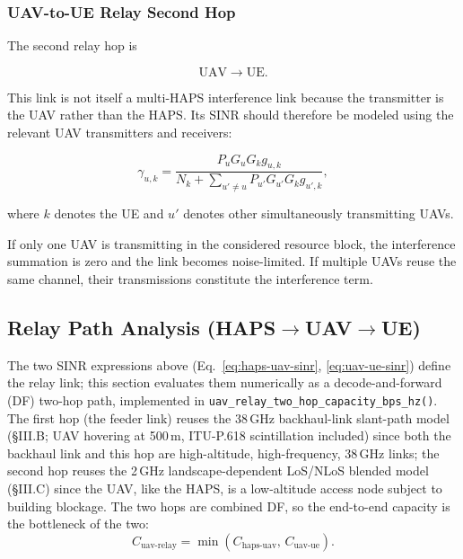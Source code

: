 \documentclass[conference]{IEEEtran}
\begin{document}
\subsubsection{UAV-to-UE Relay Second Hop}

The second relay hop is

\begin{equation}
\mathrm{UAV}\rightarrow\mathrm{UE}.
\end{equation}

This link is not itself a multi-HAPS interference link because the transmitter is the UAV rather than the HAPS. Its SINR should therefore be modeled using the relevant UAV transmitters and receivers:

\begin{equation}
\gamma_{u,k}=\frac{P_uG_uG_k g_{u,k}}{N_k + \displaystyle\sum_{u'\neq u}P_{u'}G_{u'}G_k g_{u',k}},
\label{eq:uav-ue-sinr}
\end{equation}

where $k$ denotes the UE and $u'$ denotes other simultaneously transmitting UAVs.

If only one UAV is transmitting in the considered resource block, the interference summation is zero and the link becomes noise-limited. If multiple UAVs reuse the same channel, their transmissions constitute the interference term.

\subsection{Relay Path Analysis (HAPS\texorpdfstring{$\rightarrow$}{->}UAV\texorpdfstring{$\rightarrow$}{->}UE)}
\label{sec:relay-path-analysis}

The two SINR expressions above (Eq.~\eqref{eq:haps-uav-sinr}, \eqref{eq:uav-ue-sinr})
define the relay link; this section evaluates them numerically as a
decode-and-forward (DF) two-hop path, implemented in
\texttt{uav\_relay\_two\_hop\_capacity\_bps\_hz()}. The first hop (the feeder link) reuses the
38\,GHz backhaul-link slant-path model (\S III.B; UAV hovering at 500\,m, ITU-P.618
scintillation included) since both the backhaul link and this hop are high-altitude,
high-frequency, 38\,GHz links; the second hop reuses the 2\,GHz
landscape-dependent LoS/NLoS blended model (\S III.C) since the UAV, like
the HAPS, is a low-altitude access node subject to building blockage. The
two hops are combined DF, so the end-to-end capacity is the bottleneck of
the two:
\begin{equation}
C_{\text{uav-relay}} = \min\!\left(C_{\text{haps-uav}},\, C_{\text{uav-ue}}\right).
\label{eq:uav-relay-capacity}
\end{equation}
\end{document}

